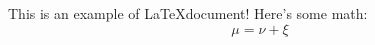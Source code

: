 \documentclass{article}
\begin{document}
This is an example of \LaTeX document! Here's some math: $$\mu = \nu + \xi$$
\end{document}

